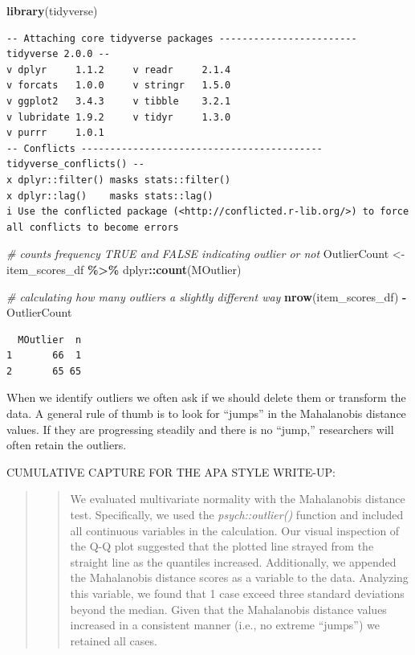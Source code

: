 \documentclass[
  11pt,
]{book}
\newenvironment{Shaded}{\begin{snugshade}}{\end{snugshade}}
\newcommand{\CommentTok}[1]{\textcolor[rgb]{0.37,0.37,0.37}{\textit{#1}}}
\newcommand{\FunctionTok}[1]{\textcolor[rgb]{0.27,0.27,0.27}{\textbf{#1}}}
\newcommand{\NormalTok}[1]{#1}
\newcommand{\OtherTok}[1]{\textcolor[rgb]{0.37,0.37,0.37}{#1}}
\newcommand{\SpecialCharTok}[1]{\textcolor[rgb]{0.43,0.43,0.43}{\textbf{#1}}}
\begin{document}
\begin{Shaded}
\begin{Highlighting}[]
\FunctionTok{library}\NormalTok{(tidyverse)}
\end{Highlighting}
\end{Shaded}

\begin{verbatim}
-- Attaching core tidyverse packages ------------------------ tidyverse 2.0.0 --
v dplyr     1.1.2     v readr     2.1.4
v forcats   1.0.0     v stringr   1.5.0
v ggplot2   3.4.3     v tibble    3.2.1
v lubridate 1.9.2     v tidyr     1.3.0
v purrr     1.0.1     
-- Conflicts ------------------------------------------ tidyverse_conflicts() --
x dplyr::filter() masks stats::filter()
x dplyr::lag()    masks stats::lag()
i Use the conflicted package (<http://conflicted.r-lib.org/>) to force all conflicts to become errors
\end{verbatim}

\begin{Shaded}
\begin{Highlighting}[]
\CommentTok{\# counts frequency TRUE and FALSE indicating outlier or not}
\NormalTok{OutlierCount }\OtherTok{\textless{}{-}}\NormalTok{ item\_scores\_df }\SpecialCharTok{\%\textgreater{}\%}
\NormalTok{    dplyr}\SpecialCharTok{::}\FunctionTok{count}\NormalTok{(MOutlier)}

\CommentTok{\# calculating how many outliers a slightly different way}
\FunctionTok{nrow}\NormalTok{(item\_scores\_df) }\SpecialCharTok{{-}}\NormalTok{ OutlierCount}
\end{Highlighting}
\end{Shaded}

\begin{verbatim}
  MOutlier  n
1       66  1
2       65 65
\end{verbatim}

When we identify outliers we often ask if we should delete them or transform the data. A general rule of thumb is to look for ``jumps'' in the Mahalanobis distance values. If they are progressing steadily and there is no ``jump,'' researchers will often retain the outliers.

CUMULATIVE CAPTURE FOR THE APA STYLE WRITE-UP:

\begin{quote}
\begin{quote}
We evaluated multivariate normality with the Mahalanobis distance test. Specifically, we used the \emph{psych::outlier()} function and included all continuous variables in the calculation. Our visual inspection of the Q-Q plot suggested that the plotted line strayed from the straight line as the quantiles increased. Additionally, we appended the Mahalanobis distance scores as a variable to the data. Analyzing this variable, we found that 1 case exceed three standard deviations beyond the median. Given that the Mahalanobis distance values increased in a consistent manner (i.e., no extreme ``jumps'') we retained all cases.
\end{quote}
\end{quote}
\end{document}
